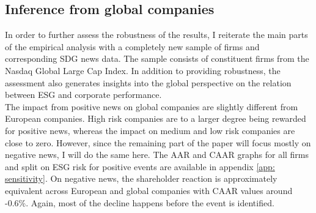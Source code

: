 \subsection{Inference from global companies}

In order to further assess the robustness of the results, I reiterate the main parts of the empirical analysis with a completely new sample of firms and corresponding SDG news data. The sample consists of constituent firms from the Nasdaq Global Large Cap Index. In addition to providing robustness, the assessment also generates insights into the global perspective on the relation between ESG and corporate performance. \\
The impact from positive news on global companies are slightly different from European companies. High risk companies are to a larger degree being rewarded for positive news, whereas the impact on medium and low risk companies are close to zero. However, since the remaining part of the paper will focus mostly on negative news, I will do the same here. The AAR and CAAR graphs for all firms and split on ESG risk for positive events are available in appendix \ref{app: sensitivity}. On negative news, the shareholder reaction is approximately equivalent across European and global companies with CAAR values around -0.6\%. Again, most of the decline happens before the event is identified.  



